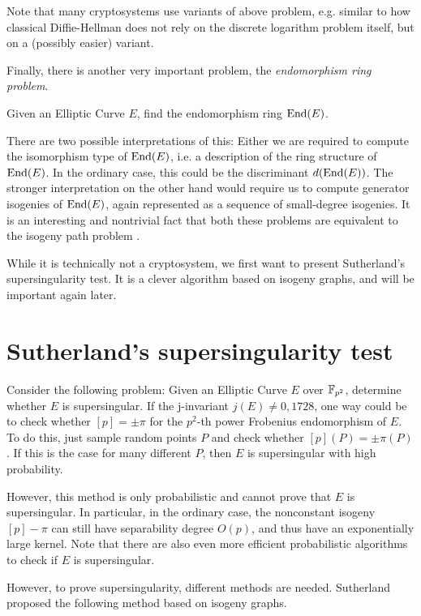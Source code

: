 Note that many cryptosystems use variants of above problem, e.g. similar to how classical Diffie-Hellman does not rely on the discrete logarithm problem itself, but on a (possibly easier) variant.

Finally, there is another very important problem, the \emph{endomorphism ring problem}.
\begin{problem}
    Given an Elliptic Curve $E$, find the endomorphism ring $\mathrm{End}(E)$.
\end{problem}
There are two possible interpretations of this:
Either we are required to compute the isomorphism type of $\mathrm{End}(E)$, i.e. a description of the ring structure of $\mathrm{End}(E)$.
In the ordinary case, this could be the discriminant $d(\mathrm{End}(E))$.
The stronger interpretation on the other hand would require us to compute generator isogenies of $\mathrm{End}(E)$, again represented as a sequence of small-degree isogenies.
It is an interesting and nontrivial fact that both these problems are equivalent to the isogeny path problem \cite{endomorphism_ring_isogeny_path_equivalent}.

While it is technically not a cryptosystem, we first want to present Sutherland's supersingularity test.
It is a clever algorithm based on isogeny graphs, and will be important again later.

\section{Sutherland's supersingularity test}
Consider the following problem: Given an Elliptic Curve $E$ over $\mathbb{F}_{p^2}$, determine whether $E$ is supersingular.
If the j-invariant $j(E) \neq 0, 1728$, one way could be to check whether $[p] = \pm \pi$ for the $p^2$-th power Frobenius endomorphism of $E$.
To do this, just sample random points $P$ and check whether $[p](P) = \pm \pi(P)$.
If this is the case for many different $P$, then $E$ is supersingular with high probability.

However, this method is only probabilistic and cannot prove that $E$ is supersingular.
In particular, in the ordinary case, the nonconstant isogeny $[p] - \pi$ can still have separability degree $O(p)$, and thus have an exponentially large kernel.
Note that there are also even more efficient probabilistic algorithms to check if $E$ is supersingular.

However, to prove supersingularity, different methods are needed.
Sutherland \cite{sutherland_supersingularity_test} proposed the following method based on isogeny graphs.

